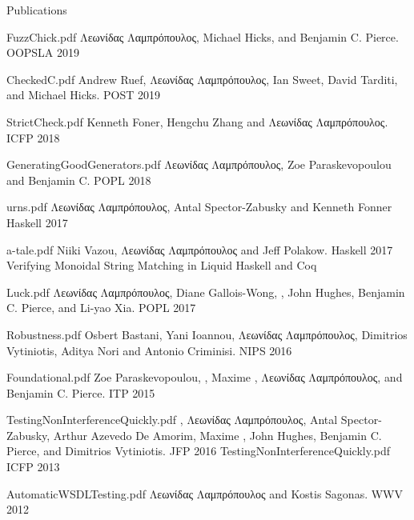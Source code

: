 \documentclass{resume} %
\begin{document}
\begin{rSection}{Publications}

    {FuzzChick.pdf}
    {\textgreek{Λεωνίδας Λαμπρόπουλος}, Michael Hicks, \textgreek{and} Benjamin C. Pierce.}
    {OOPSLA 2019}
    
    {CheckedC.pdf}
    {Andrew Ruef, \textgreek{Λεωνίδας Λαμπρόπουλος}, Ian Sweet, David Tarditi, \textgreek{and} Michael Hicks.}
    {POST 2019}

    {StrictCheck.pdf}
    {Kenneth Foner, Hengchu Zhang \textgreek{and} \textgreek{Λεωνίδας Λαμπρόπουλος}.}
    {ICFP 2018}

    {GeneratingGoodGenerators.pdf}
    {\textgreek{Λεωνίδας Λαμπρόπουλος}, Zoe Paraskevopoulou \textgreek{and} Benjamin C.}
    {POPL 2018}

    {urns.pdf}
    {\textgreek{Λεωνίδας Λαμπρόπουλος}, Antal Spector-Zabusky \textgreek{and} Kenneth Fonner}
    {Haskell 2017}

    {a-tale.pdf}
    {Niiki Vazou, \textgreek{Λεωνίδας Λαμπρόπουλος} \textgreek{and} Jeff Polakow.}
    {Haskell 2017}
    {Verifying Monoidal String Matching in Liquid Haskell and Coq}

    {Luck.pdf}
    {\textgreek{Λεωνίδας Λαμπρόπουλος}, Diane Gallois-Wong, \Catalin \Hritcu, John Hughes, Benjamin C. Pierce, \textgreek{and} Li-yao Xia.}
    {POPL 2017}

    {Robustness.pdf}
    {Osbert Bastani, Yani Ioannou, \textgreek{Λεωνίδας Λαμπρόπουλος}, Dimitrios Vytiniotis, Aditya Nori \textgreek{and} Antonio Criminisi.}
    {NIPS 2016}

    {Foundational.pdf}
    {Zoe Paraskevopoulou, \Catalin \Hritcu, Maxime \Denes, \textgreek{Λεωνίδας Λαμπρόπουλος}, \textgreek{and} Benjamin C. Pierce.}
    {ITP 2015}
    
    {TestingNonInterferenceQuickly.pdf}
    {\Catalin \Hritcu, \textgreek{Λεωνίδας Λαμπρόπουλος}, Antal Spector-Zabusky, Arthur
    Azevedo De Amorim, Maxime \Denes, John Hughes, Benjamin C. Pierce, \textgreek{and} Dimitrios
    Vytiniotis.}
    {JFP 2016}
    {TestingNonInterferenceQuickly.pdf}
    {ICFP 2013}
%

    {AutomaticWSDLTesting.pdf}
    {\textgreek{Λεωνίδας Λαμπρόπουλος} \textgreek{and} Kostis Sagonas.}
    {WWV 2012}
   
\end{rSection}
\end{document}
